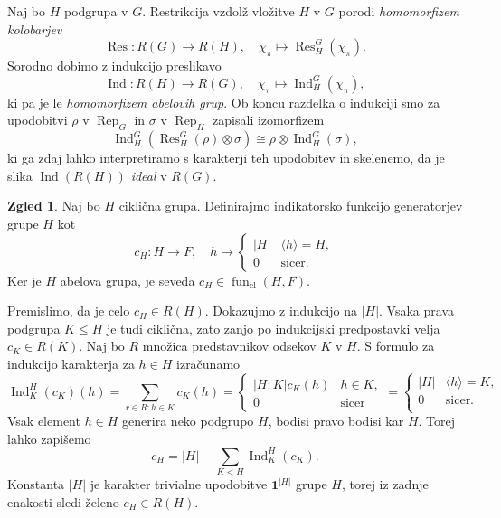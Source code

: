 \documentclass[11pt]{book}
\def\11{\mathbf{1}}
\DeclareMathOperator\Res{Res}
\DeclareMathOperator\Ind{Ind}
\DeclareMathOperator\Rep{Rep}
\DeclareMathOperator\cl{cl}
\DeclareMathOperator\fun{fun}
\theoremstyle{definition}
\theoremstyle{zgled}
\newtheorem*{zgled}{Zgled}
\theoremstyle{odprtproblem}
\theoremstyle{domacanaloga}
\theoremstyle{izrek}
\begin{document}
Naj bo $H$ podgrupa v $G$. Restrikcija vzdolž vložitve $H$ v $G$ porodi \emph{homomorfizem kolobarjev}
\[
    \textstyle \Res \colon R(G) \to R(H), \quad \chi_{\pi} \mapsto \Res^G_H(\chi_{\pi}).
\]
Sorodno dobimo z indukcijo preslikavo
\[
    \textstyle \Ind \colon R(H) \to R(G), \quad \chi_{\pi} \mapsto \Ind^G_H(\chi_{\pi}),
\]
ki pa je le \emph{homomorfizem abelovih grup}. Ob koncu razdelka o indukciji smo za upodobitvi $\rho$ v $\Rep_G$ in $\sigma$ v $\Rep_H$ zapisali izomorfizem
\[
    \textstyle \Ind^G_H(\Res^G_H(\rho) \otimes \sigma) \cong
        \rho \otimes \Ind^G_H(\sigma),
\]
ki ga zdaj lahko interpretiramo s karakterji teh upodobitev in skelenemo, da je slika $\Ind(R(H))$ \emph{ideal} v $R(G)$.

\begin{zgled}
Naj bo $H$ ciklična grupa. Definirajmo indikatorsko funkcijo generatorjev grupe $H$ kot
\[
    c_H \colon H \to F, \quad
    h \mapsto \begin{cases} |H| & \langle h \rangle = H, \\ 0 & \text{sicer.} \end{cases}
\]
Ker je $H$ abelova grupa, je seveda $c_H \in \fun_{\cl}(H,F)$. 

Premislimo, da je celo $c_H \in R(H)$. Dokazujmo z indukcijo na $|H|$. Vsaka prava podgrupa $K \leq H$ je tudi ciklična, zato zanjo po indukcijski predpostavki velja $c_K \in R(K)$. Naj bo $R$ množica predstavnikov odsekov $K$ v $H$. S formulo za indukcijo karakterja za $h \in H$ izračunamo
\[
    {\textstyle \Ind^H_K(c_K)(h)} = \sum_{r \in R \colon h \in K} c_K(h) =
    \begin{cases} |H:K| c_K(h) & h \in K, \\ 0 & \text{sicer}  \end{cases} =
    \begin{cases}  |H| & \langle h \rangle = K, \\ 0 & \text{sicer.} \\ \end{cases}
\]
Vsak element $h \in H$ generira neko podgrupo $H$, bodisi pravo bodisi kar $H$. Torej lahko zapišemo
\[
    c_H = |H| - \sum_{K < H} \textstyle  \Ind^H_K(c_K).
\]
Konstanta $|H|$ je karakter trivialne upodobitve $\11^{|H|}$ grupe $H$, torej iz zadnje enakosti sledi želeno $c_H \in R(H)$. 
\end{zgled}
\end{document}
